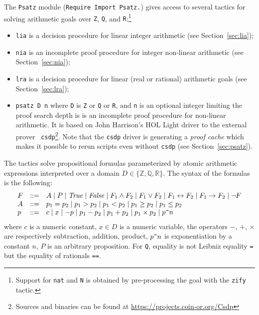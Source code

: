 \newtheorem{theorem}{Theorem}

 
   
\label{sec:psatz-hurry}
The {\tt Psatz} module ({\tt Require Import Psatz.}) gives access to
several tactics for solving arithmetic goals over {\tt Z}, {\tt Q}, and
{\tt R}:\footnote{Support for {\tt nat} and {\tt N} is obtained by
  pre-processing the goal with the {\tt zify} tactic.}
\begin{itemize}
\item {\tt lia} is a decision procedure for linear integer arithmetic (see Section~\ref{sec:lia});
\item {\tt nia} is an incomplete proof procedure for integer non-linear arithmetic (see Section~\ref{sec:nia});
\item {\tt lra} is a decision procedure for linear (real or rational) arithmetic goals (see Section~\ref{sec:lra});
\item {\tt psatz D n} where {\tt D} is {\tt Z} or {\tt Q} or {\tt R}, and
  {\tt n} is an optional integer limiting the proof search depth is is an
  incomplete proof procedure for non-linear arithmetic. It is based on
  John Harrison's HOL Light driver to the external prover {\tt
    csdp}\footnote{Sources and binaries can be found at
    \url{https://projects.coin-or.org/Csdp}}. Note that the {\tt csdp}
  driver is generating a \emph{proof cache} which makes it possible to
  rerun scripts even without {\tt csdp} (see Section~\ref{sec:psatz}).
\end{itemize}

The tactics solve propositional formulas parameterized by atomic arithmetic expressions
interpreted over a domain $D \in \{\mathbb{Z}, \mathbb{Q}, \mathbb{R} \}$.
The syntax of the formulas is the following:
\[
\begin{array}{lcl}
 F &::=&  A \mid P \mid \mathit{True} \mid \mathit{False} \mid F_1 \land F_2 \mid F_1 \lor F_2 \mid F_1 \leftrightarrow F_2 \mid F_1 \to F_2 \mid \neg F\\
 A &::=& p_1 = p_2 \mid  p_1 > p_2 \mid p_1 < p_2 \mid p_1 \ge p_2 \mid p_1 \le p_2 \\
 p &::=& c \mid x \mid {-}p \mid p_1 - p_2 \mid p_1 + p_2 \mid p_1 \times p_2 \mid p \verb!^! n
\end{array}
\]
where $c$ is a numeric constant, $x\in D$ is a numeric variable, the
operators $-$, $+$, $\times$ are respectively subtraction, addition,
product, $p \verb!^!n $ is exponentiation by a constant $n$, $P$ is an
arbitrary proposition.
 For {\tt Q}, equality is not Leibniz equality {\tt =} but the equality of rationals {\tt ==}.

